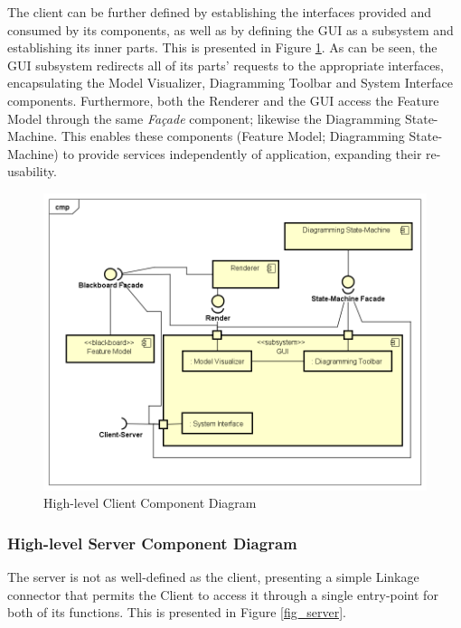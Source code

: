 The client can be further defined by establishing the interfaces provided and consumed by its components, as well as by defining the GUI as a subsystem and establishing its inner parts. This is presented in Figure \ref{fig_client}. As can be seen, the GUI subsystem redirects all of its parts' requests to the appropriate interfaces, encapsulating the Model Visualizer, Diagramming Toolbar and System Interface components. Furthermore, both the Renderer and the GUI access the Feature Model through the same \textit{Façade} component; likewise the Diagramming State-Machine. This enables these components (Feature Model; Diagramming State-Machine) to provide services independently of application, expanding their re-usability.

\begin{figure}[ht]
    \centering
        \includegraphics[scale=0.52]{figures/Client.png}
	\caption{High-level Client Component Diagram}
	\label{fig_client}
\end{figure}

\subsubsection{High-level Server Component Diagram}

The server is not as well-defined as the client, presenting a simple Linkage connector that permits the Client to access it through a single entry-point for both of its functions. This is presented in Figure \ref{fig_server}.

